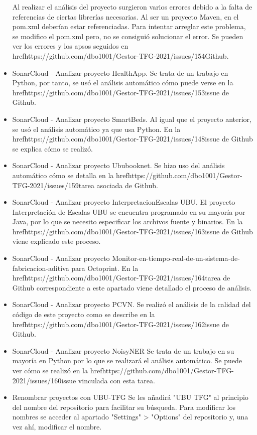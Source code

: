 \begin{itemize}
		Al realizar el análisis del proyecto surgieron varios errores debido a la falta de referencias de ciertas librerías necesarias. Al ser un proyecto Maven, en el pom.xml deberían estar referenciadas. Para intentar arreglar este problema, se modifico el pom.xml pero, no se consiguió solucionar el error. Se pueden ver los errores y los apsos seguidos en href{https://github.com/dbo1001/Gestor-TFG-2021/issues/154}{Github}.
	\item SonarCloud - Analizar proyecto HealthApp.
		Se trata de un trabajo en Python, por tanto, se usó el análisis automático cómo puede verse en la href{https://github.com/dbo1001/Gestor-TFG-2021/issues/153}{issue de Github}.
	\item SonarCloud - Analizar proyecto SmartBeds.
		Al igual que el proyecto anterior, se usó el análisis automático ya que usa Python. En la href{https://github.com/dbo1001/Gestor-TFG-2021/issues/148}{issue de Github} se explica cómo se realizó.
	\item SonarCloud - Analizar proyecto Ububooknet.
		Se hizo uso del análisis automático cómo se detalla en la href{https://github.com/dbo1001/Gestor-TFG-2021/issues/159}{tarea} asociada de Github.
	\item SonarCloud - Analizar proyecto InterpretacionEscalas UBU.
		El proyecto Interpretación de Escalas UBU se encuentra programado en su mayoría por Java, por lo que se necesito especificar los archivos fuente y binarios. En la href{https://github.com/dbo1001/Gestor-TFG-2021/issues/163}{issue} de Github viene explicado este proceso.
	\item SonarCloud - Analizar proyecto Monitor-en-tiempo-real-de-un-sistema-de-fabricacion-aditiva para Octoprint.
		En la href{https://github.com/dbo1001/Gestor-TFG-2021/issues/164}{tarea} de Github correspondiente a este apartado viene detallado el proceso de análisis.
	\item SonarCloud - Analizar proyecto PCVN.
		Se realizó el análisis de la calidad del código de este proyecto como se describe en la href{https://github.com/dbo1001/Gestor-TFG-2021/issues/162}{issue} de Github.
	\item SonarCloud - Analizar proyecto NoisyNER
		Se trata de un trabajo en su mayoría en Python por lo que se realizará el análisis automático. Se puede ver cómo se realizó en la href{https://github.com/dbo1001/Gestor-TFG-2021/issues/160}{issue} vinculada con esta tarea.
	\item Renombrar proyectos con UBU-TFG
		Se les añadirá "UBU TFG" al principio del nombre del repositorio para facilitar su búsqueda. Para modificar los nombres se acceder al apartado "Settings" > "Options" del repositorio y, una vez ahí, modificar el nombre.

\end{itemize}
